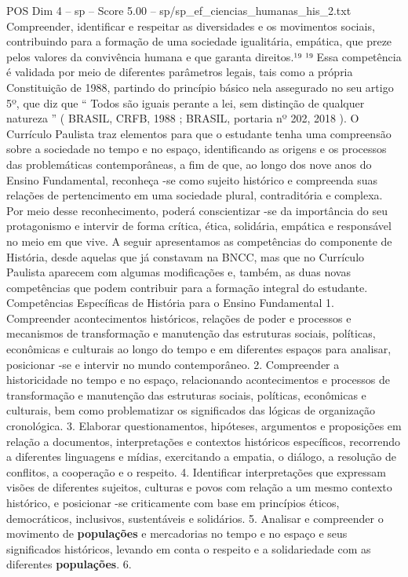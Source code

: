 \begin{textsample}{POS Dim 4 – sp – Score 5.00 – sp/sp\_ef\_ciencias\_humanas\_his\_2.txt}
Compreender, identificar e respeitar as diversidades e os movimentos sociais, contribuindo para a formação de uma sociedade igualitária, empática, que preze pelos valores da convivência humana e que garanta direitos.¹⁹ ¹⁹ Essa competência é validada por meio de diferentes parâmetros legais, tais como a própria Constituição de 1988, partindo do princípio básico nela assegurado no seu artigo 5º, que diz que “ Todos são iguais perante a lei, sem distinção de qualquer natureza ” ( BRASIL, CRFB, 1988 ; BRASIL, portaria nº 202, 2018 ).
O Currículo Paulista traz elementos para que o estudante tenha uma compreensão sobre a sociedade no tempo e no espaço, identificando as origens e os processos das problemáticas contemporâneas, a fim de que, ao longo dos nove anos do Ensino Fundamental, reconheça -se como sujeito histórico e compreenda suas relações de pertencimento em uma sociedade plural, contraditória e complexa.
Por meio desse reconhecimento, poderá conscientizar -se da importância do seu protagonismo e intervir de forma crítica, ética, solidária, empática e responsável no meio em que vive.
A seguir apresentamos as competências do componente de História, desde aquelas que já constavam na BNCC, mas que no Currículo Paulista aparecem com algumas modificações e, também, as duas novas competências que podem contribuir para a formação integral do estudante.
Competências Específicas de História para o Ensino Fundamental 1.
Compreender acontecimentos históricos, relações de poder e processos e mecanismos de transformação e manutenção das estruturas sociais, políticas, econômicas e culturais ao longo do tempo e em diferentes espaços para analisar, posicionar -se e intervir no mundo contemporâneo. 2.
Compreender a historicidade no tempo e no espaço, relacionando acontecimentos e processos de transformação e manutenção das estruturas sociais, políticas, econômicas e culturais, bem como problematizar os significados das lógicas de organização cronológica. 3.
Elaborar questionamentos, hipóteses, argumentos e proposições em relação a documentos, interpretações e contextos históricos específicos, recorrendo a diferentes linguagens e mídias, exercitando a empatia, o diálogo, a resolução de conflitos, a cooperação e o respeito. 4.
Identificar interpretações que expressam visões de diferentes sujeitos, culturas e povos com relação a um mesmo contexto histórico, e posicionar -se criticamente com base em princípios éticos, democráticos, inclusivos, sustentáveis e solidários. 5.
Analisar e compreender o movimento de \textbf{populações} e mercadorias no tempo e no espaço e seus significados históricos, levando em conta o respeito e a solidariedade com as diferentes \textbf{populações}. 6.

\end{textsample}
